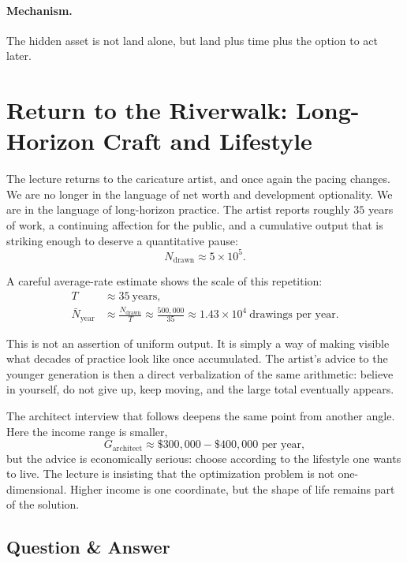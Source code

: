 \paragraph{Mechanism.} The hidden asset is not land alone, but land plus time plus the option to act later.

\section{Return to the Riverwalk: Long-Horizon Craft and Lifestyle}

The lecture returns to the caricature artist, and once again the pacing changes. We are no longer in the language of net worth and development optionality. We are in the language of long-horizon practice. The artist reports roughly \(35\) years of work, a continuing affection for the public, and a cumulative output that is striking enough to deserve a quantitative pause:
\begin{equation}
N_{\text{drawn}} \approx 5\times 10^5.
\end{equation}

A careful average-rate estimate shows the scale of this repetition:
\begin{align}
T &\approx 35\ \text{years},\\
\bar N_{\text{year}} &\approx \frac{N_{\text{drawn}}}{T}
\approx \frac{500{,}000}{35}
\approx 1.43\times 10^4\ \text{drawings per year}.
\end{align}

This is not an assertion of uniform output. It is simply a way of making visible what decades of practice look like once accumulated. The artist's advice to the younger generation is then a direct verbalization of the same arithmetic: believe in yourself, do not give up, keep moving, and the large total eventually appears.

The architect interview that follows deepens the same point from another angle. Here the income range is smaller,
\begin{equation}
G_{\text{architect}} \approx \$300{,}000-\$400{,}000 \text{ per year},
\end{equation}
but the advice is economically serious: choose according to the lifestyle one wants to live. The lecture is insisting that the optimization problem is not one-dimensional. Higher income is one coordinate, but the shape of life remains part of the solution.

\subsection{Question \& Answer}

